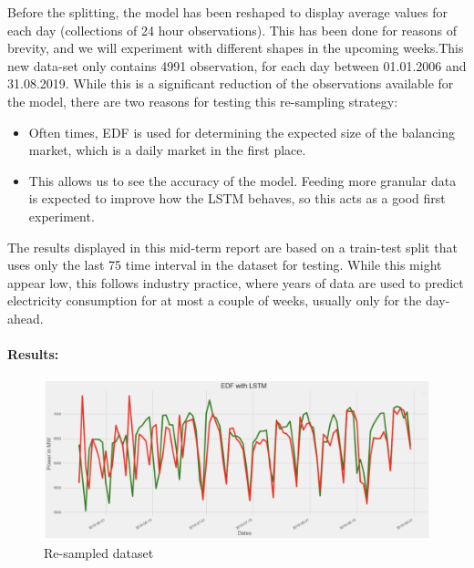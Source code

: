 \documentclass[10pt,twocolumn,letterpaper]{article}
\begin{document}
Before the splitting, the model has been reshaped to display average values for each day (collections of 24 hour observations). This has been done for reasons of brevity, and we will experiment with different shapes in the upcoming weeks.This new data-set only contains 4991 observation, for each day between 01.01.2006 and 31.08.2019. While this is a significant reduction of the observations available for the model, there are two reasons for testing this re-sampling strategy: 
\begin{itemize}
\item Often times, EDF is used for determining the expected size of the balancing market, which is a daily market in the first place.
\item This allows us to see the accuracy of the model. Feeding more granular data is expected to improve how the LSTM behaves, so this acts as a good first experiment.
\end{itemize}

The results displayed in this mid-term report are based on a train-test split that uses only the last 75 time interval in the dataset for testing. While this might appear low, this follows industry practice, where years of data are used to predict electricity consumption for at most a couple of weeks, usually only for the day-ahead. 

\paragraph{Results:} 

\begin{figure}[H]
\begin{center}
   \includegraphics[width=\linewidth]{midterm-report-latex/LTSM_EDF.png}
\end{center}
   \caption{Re-sampled dataset}
\end{figure}
\end{document}
